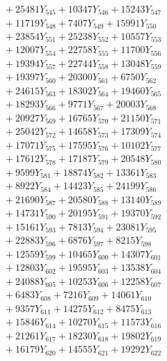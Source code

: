 \documentclass[a4paper,10pt]{article}
\begin{document}
{\begin{align}
&\;  + 25481 Y_{545} + 10347 Y_{546} + 15243 Y_{547} \\[0.3ex]
&\;  + 11719 Y_{548} + 7407 Y_{549} + 15991 Y_{550} \\[0.3ex]
&\;  + 23854 Y_{551} + 25238 Y_{552} + 10557 Y_{553} \\[0.3ex]
&\;  + 12007 Y_{554} + 22758 Y_{555} + 11700 Y_{556} \\[0.3ex]
&\;  + 19394 Y_{557} + 22744 Y_{558} + 13048 Y_{559} \\[0.3ex]
&\;  + 19397 Y_{560} + 20300 Y_{561} + 6750 Y_{562} \\[0.3ex]
&\;  + 24615 Y_{563} + 18302 Y_{564} + 19460 Y_{565} \\[0.3ex]
&\;  + 18293 Y_{566} + 9771 Y_{567} + 20003 Y_{568} \\[0.5ex]\allowbreak
&\;  + 20927 Y_{569} + 16765 Y_{570} + 21150 Y_{571} \\[0.3ex]
&\;  + 25042 Y_{572} + 14658 Y_{573} + 17309 Y_{574} \\[0.3ex]
&\;  + 17071 Y_{575} + 17595 Y_{576} + 10102 Y_{577} \\[0.3ex]
&\;  + 17612 Y_{578} + 17187 Y_{579} + 20548 Y_{580} \\[0.3ex]
&\;  + 9599 Y_{581} + 18874 Y_{582} + 13361 Y_{583} \\[0.3ex]
&\;  + 8922 Y_{584} + 14423 Y_{585} + 24199 Y_{586} \\[0.3ex]
&\;  + 21690 Y_{587} + 20580 Y_{588} + 13140 Y_{589} \\[0.3ex]
&\;  + 14731 Y_{590} + 20195 Y_{591} + 19370 Y_{592} \\[0.3ex]
&\;  + 15161 Y_{593} + 7813 Y_{594} + 23081 Y_{595} \\[0.3ex]
&\;  + 22883 Y_{596} + 6876 Y_{597} + 8215 Y_{598} \\[0.5ex]\allowbreak
&\;  + 12559 Y_{599} + 10465 Y_{600} + 14307 Y_{601} \\[0.3ex]
&\;  + 12803 Y_{602} + 19595 Y_{603} + 13538 Y_{604} \\[0.3ex]
&\;  + 24088 Y_{605} + 10253 Y_{606} + 12258 Y_{607} \\[0.3ex]
&\;  + 6483 Y_{608} + 7216 Y_{609} + 14061 Y_{610} \\[0.3ex]
&\;  + 9357 Y_{611} + 14275 Y_{612} + 8475 Y_{613} \\[0.3ex]
&\;  + 15846 Y_{614} + 10270 Y_{615} + 11573 Y_{616} \\[0.3ex]
&\;  + 21261 Y_{617} + 18230 Y_{618} + 19802 Y_{619} \\[0.3ex]
&\;  + 16179 Y_{620} + 14555 Y_{621} + 19292 Y_{622} \\[0.3ex]

\end{align}}
\end{document}
